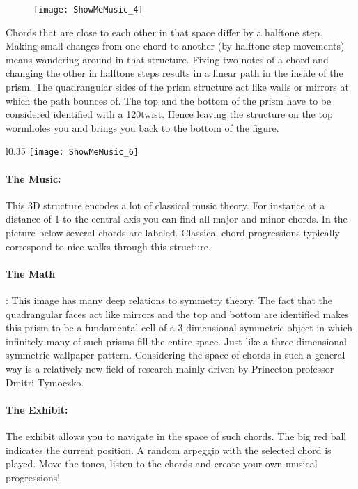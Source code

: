 \begin{figure}[h]
\centering
\texttt{[image: ShowMeMusic\_4]}
\end{figure}

Chords that are close to each other in that space differ by a halftone step. Making small changes from one chord to another (by halftone step movements) means wandering around in that structure. Fixing two notes of a chord and changing the other in halftone steps results in a linear path in the inside of the prism. The quadrangular sides of the prism structure act like walls or mirrors at which the path bounces of. The top and the bottom of the prism have to be considered identified with a 120\textdegree twist. Hence leaving the structure on the top wormholes you and brings you back to the bottom of the figure.

\begin{wrapfigure}[18]{l}{0.35\textwidth}
\centering
\texttt{[image: ShowMeMusic\_6]}
\end{wrapfigure}
\paragraph{The Music:} This 3D structure encodes a lot of classical music theory. For instance at a distance of 1 to the central axis you can find all major and minor chords. In the picture below several chords are labeled. Classical chord progressions typically correspond to nice walks through this structure.

\paragraph{The Math}: This image has many deep relations to symmetry theory. The fact that the quadrangular faces act like mirrors and the top and bottom are identified makes this prism to be a fundamental cell of a 3-dimensional symmetric object in which infinitely many of such prisms fill the entire space. Just like a three dimensional symmetric wallpaper pattern. Considering the space of chords in such a general way is a relatively new field of research mainly driven by Princeton professor Dmitri Tymoczko.\\

\paragraph{The Exhibit:} The exhibit allows you to navigate in the space of such chords. The big red ball indicates the current position. A random arpeggio with the selected chord is played. Move the tones, listen to the chords and create your own musical progressions!


